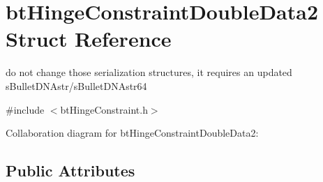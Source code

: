 \hypertarget{structbt_hinge_constraint_double_data2}{\section{bt\+Hinge\+Constraint\+Double\+Data2 Struct Reference}
\label{structbt_hinge_constraint_double_data2}
}


do not change those serialization structures, it requires an updated s\+Bullet\+D\+N\+Astr/s\+Bullet\+D\+N\+Astr64  




{\ttfamily \#include $<$bt\+Hinge\+Constraint.\+h$>$}



Collaboration diagram for bt\+Hinge\+Constraint\+Double\+Data2\+:
\subsection*{Public Attributes}
